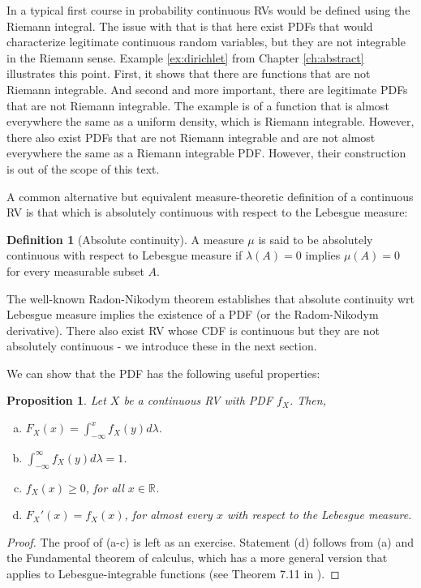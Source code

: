 \documentclass{book}
\theoremstyle{plain}%
\newtheorem{proposition}{Proposition}[section]
\theoremstyle{definition}
\newtheorem{definition}{Definition}[section]
\begin{document}
In a typical first course in probability continuous RVs would be defined using the Riemann integral. The issue with that is that here exist PDFs that would characterize legitimate continuous random variables, but they are not integrable in the Riemann sense. Example \ref{ex:dirichlet} from Chapter \ref{ch:abstract} illustrates this point. First, it shows that there are functions that are not Riemann integrable. And second and more important, there are legitimate PDFs that are not Riemann integrable. The example is of a function that is almost everywhere the same as a uniform density, which is Riemann integrable. However, there also exist PDFs that are not Riemann integrable and are not almost everywhere the same as a Riemann integrable PDF. However, their construction is out of the scope of this text.

A common alternative but equivalent measure-theoretic definition of a continuous RV is that which is absolutely continuous with respect to the Lebesgue measure:

\begin{definition}[Absolute continuity]
A measure $\mu$ is said to be absolutely continuous with respect to Lebesgue measure if $\lambda(A) = 0$ implies $\mu(A) = 0$ for every measurable subset $A$.
\end{definition}

The well-known Radon-Nikodym theorem establishes that absolute continuity wrt Lebesgue measure implies the existence of a PDF (or the Radom-Nikodym derivative). There also exist RV whose CDF is continuous but they are not absolutely continuous - we introduce these in the next section.

We can show that the PDF has the following useful properties:

\begin{proposition}
Let $X$ be a continuous RV with PDF $f_X$. Then,
\begin{enumerate}[(a)]
\item $F_X(x) = \int_{-\infty}^x f_X(y)d\lambda$.
\item $\int_{-\infty}^\infty f_X(y)d\lambda = 1$.
\item $f_X(x) \geq 0$, for all $x \in \mathbb{R}$.
\item $F_X'(x) = f_X(x)$, for almost every $x$ with respect to the Lebesgue measure.
\end{enumerate}\label{prop:pdf}
\end{proposition}

\begin{proof}
The proof of (a-c) is left as an exercise. Statement (d) follows from (a) and the Fundamental theorem of calculus, which has a more general version that applies to Lebesgue-integrable functions (see Theorem 7.11 in \cite{Rudin1987}).
\end{proof}
\end{document}
